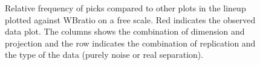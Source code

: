 \documentclass[12]{article}
\begin{document}
\begin{figure}[hbtp]
   \centering
       \caption{Relative frequency of picks compared to other plots in the lineup plotted against WBratio on a free scale. Red indicates the observed data plot. The columns shows the combination of dimension and projection and the row indicates the combination of replication and the type of the data (purely noise or real separation).}
       \label{wbratio}
\end{figure}

\end{document}
